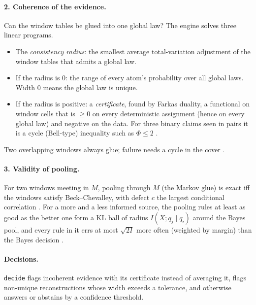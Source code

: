 \documentclass[11pt]{article}
\theoremstyle{definition}\newtheorem{definition}{Definition}
\begin{document}
\paragraph{2. Coherence of the evidence.} Can the window tables be glued into one global law? The engine solves three linear programs.
\begin{itemize}[nosep]
\item The \emph{consistency radius}: the smallest average total-variation adjustment of the window tables that admits a global law.
\item If the radius is $0$: the range of every atom's probability over all global laws. Width $0$ means the global law is unique.
\item If the radius is positive: a \emph{certificate}, found by Farkas duality, a functional on window cells that is $\ge0$ on every
  deterministic assignment (hence on every global law) and negative on the data. For three binary claims seen in pairs it is a cycle
  (Bell-type) inequality such as $\Phi\le2$ \cite[Prop.~16.1]{Main}.
\end{itemize}
Two overlapping windows always glue; failure needs a cycle in the cover \cite[Prop.~16.3]{Main}.

\paragraph{3. Validity of pooling.} For two windows meeting in $M$, pooling through $M$ (the Markov glue) is exact iff the windows
satisfy Beck--Chevalley, with defect $c$ the largest conditional correlation \cite[Thm.~14.4]{Main}. For a more and a less informed
source, the pooling rules at least as good as the better one form a KL ball of radius $I(X;q_j\mid q_i)$ around the Bayes pool, and every
rule in it errs at most $\sqrt{2I}$ more often (weighted by margin) than the Bayes decision \cite[Thm.~7, Prop.~9]{Pooling}.

\paragraph{Decisions.} \texttt{decide} flags incoherent evidence with its certificate instead of averaging it, flags non-unique
reconstructions whose width exceeds a tolerance, and otherwise answers or abstains by a confidence threshold.
\end{document}
